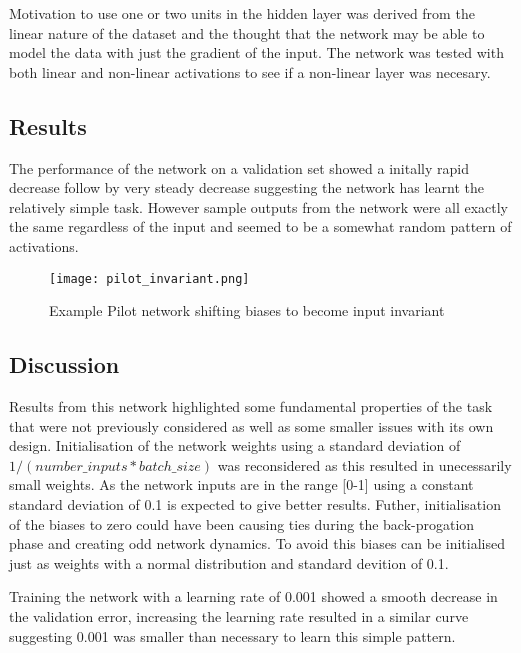 
Motivation to use one or two units in the hidden layer was derived from the linear nature of the dataset and the thought that the network may be able to model the data with just the gradient of the input.
The network was tested with both linear and non-linear activations to see if a non-linear layer was necesary.

\subsection{Results}
The performance of the network on a validation set showed a initally rapid decrease follow by very steady decrease suggesting the network has learnt the relatively simple task.
However sample outputs from the network were all exactly the same regardless of the input and seemed to be a somewhat random pattern of activations.

\begin{figure}[h]
    \centering
    \texttt{[image: pilot\_invariant.png]}
    \caption{Example Pilot network shifting biases to become input invariant}
    \label{fig:pilotInvariance}
\end{figure}



\subsection{Discussion}
Results from this network highlighted some fundamental properties of the task that were not previously considered as well as some smaller issues with its own design.
Initialisation of the network weights using a standard deviation of $1 / ( number\_inputs * batch\_size )$ was reconsidered as this resulted in unecessarily small weights. 
As the network inputs are in the range [0-1] using a constant standard deviation of 0.1 is expected to give better results. 
Futher, initialisation of the biases to zero could have been causing ties during the back-progation phase and creating odd network dynamics.
To avoid this biases can be initialised just as weights with a normal distribution and standard devition of 0.1.

Training the network with a learning rate of 0.001 showed a smooth decrease in the validation error, increasing the learning rate resulted in a similar curve suggesting 0.001 was smaller than necessary to learn this simple pattern. 

